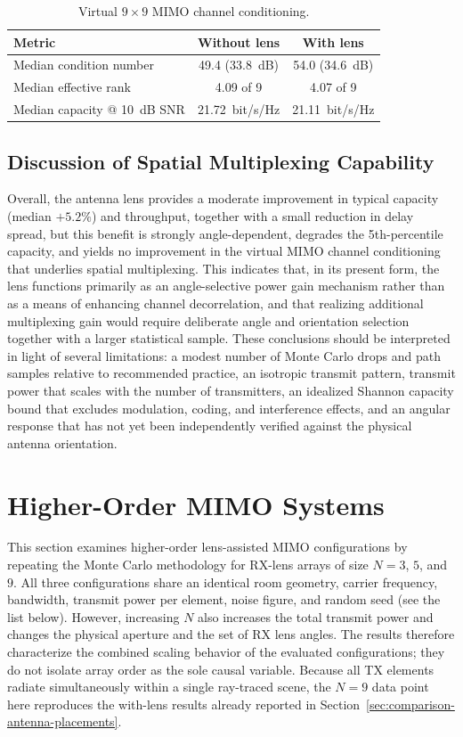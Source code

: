 \begin{table}[htbp]
    \centering
    \caption{Virtual $9\times9$ MIMO channel conditioning.}
    \label{tab:mc9x9-mimo}
    \begin{tabular}{lcc}
        \toprule
        \textbf{Metric} & \textbf{Without lens} & \textbf{With lens} \\
        \midrule
        Median condition number & 49.4 (33.8~dB) & 54.0 (34.6~dB) \\
        Median effective rank & 4.09 of 9 & 4.07 of 9 \\
        Median capacity @ 10~dB SNR & 21.72~bit/s/Hz & 21.11~bit/s/Hz \\
        \bottomrule
    \end{tabular}
\end{table}

\subsection{Discussion of Spatial Multiplexing Capability}

Overall, the antenna lens provides a moderate improvement in typical capacity (median $+5.2\%$) and throughput, together with a small reduction in delay spread, but this benefit is strongly angle-dependent, degrades the 5th-percentile capacity, and yields no improvement in the virtual MIMO channel conditioning that underlies spatial multiplexing. This indicates that, in its present form, the lens functions primarily as an angle-selective power gain mechanism rather than as a means of enhancing channel decorrelation, and that realizing additional multiplexing gain would require deliberate angle and orientation selection together with a larger statistical sample. These conclusions should be interpreted in light of several limitations: a modest number of Monte Carlo drops and path samples relative to recommended practice, an isotropic transmit pattern, transmit power that scales with the number of transmitters, an idealized Shannon capacity bound that excludes modulation, coding, and interference effects, and an angular response that has not yet been independently verified against the physical antenna orientation.

\section{Higher-Order MIMO Systems}

This section examines higher-order lens-assisted MIMO configurations by repeating the Monte Carlo methodology for RX-lens arrays of size $N=3$, $5$, and $9$. All three configurations share an identical room geometry, carrier frequency, bandwidth, transmit power per element, noise figure, and random seed (see the list below). However, increasing $N$ also increases the total transmit power and changes the physical aperture and the set of RX lens angles. The results therefore characterize the combined scaling behavior of the evaluated configurations; they do not isolate array order as the sole causal variable. Because all TX elements radiate simultaneously within a single ray-traced scene, the $N=9$ data point here reproduces the with-lens results already reported in Section~\ref{sec:comparison-antenna-placements}.

